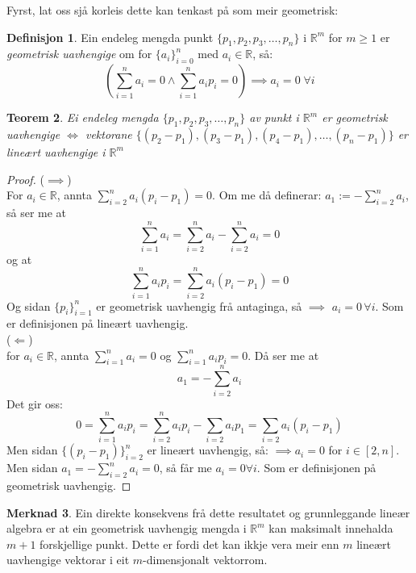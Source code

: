 \documentclass[a4paper, titlepage, 12pt, norsk]{article}
\theoremstyle{plain}
\newtheorem{theorem}{Teorem}[section]
\theoremstyle{definition}
\newtheorem{definition}[theorem]{Definisjon}
\newtheorem{remark}[theorem]{Merknad}
\newcommand{\Rb}{\mathbb{R}}
\begin{document}
Fyrst, lat oss sjå korleis dette kan tenkast på som meir geometrisk:

\begin{definition}
	Ein endeleg mengda punkt $\{p_1, p_2, p_3, \dots, p_n\}$ i $\Rb^m$ for $m\geq1$ er \emph{geometrisk uavhengige} om for $\{a_i\}_{i=0}^n$ med $a_i\in\Rb$, så:
	\begin{equation*}
		\left(\sum_{i=1}^n a_i=0 \land  \sum_{i=1}^n a_ip_i=0\right)\implies a_i=0 \; \forall i
	\end{equation*}
\end{definition}

\begin{theorem}\label{thm:geometrisklineærtuavhengig}
	Ei endeleg mengda $\{p_1, p_2, p_3, \dots, p_n \}$ av punkt i $\Rb^m$ er geometrisk uavhengige $\Longleftrightarrow$ vektorane $\{(p_2-p_1), (p_3-p_1), (p_4-p_1),\dots,(p_n-p_1)\}$ er lineært uavhengige i $\Rb^m$
\end{theorem}

\begin{proof}
	($\implies$)
	\\For $a_i\in\Rb$, annta $\sum_{i=2}^na_i(p_i-p_1)=0$. Om me då definerar: $a_1 := -\sum_{i=2}^na_i$, så ser me at 
	\begin{equation*}
		\sum_{i=1}^na_i=\sum_{i=2}^na_i-\sum_{i=2}^na_i=0
	\end{equation*}
	og at 
	\begin{equation*}
		\sum_{i=1}^na_ip_i=\sum_{i=2}^na_i(p_i-p_1)=0
	\end{equation*}
	Og sidan $\{p_i\}_{i=1}^n$ er geometrisk uavhengig frå antaginga, så $\implies$ $a_i=0 \, \forall i$. Som er definisjonen på lineært uavhengig.
	\\(\(\Longleftarrow\))
	\\for $a_i\in\Rb$, annta $\sum_{i=1}^n a_i=0$ og $\sum_{i=1}^n a_ip_i=0$. Då ser me at 
	\begin{equation*}
		a_1=-\sum_{i=2}^n a_i
	\end{equation*} 
	Det gir oss: 
	\begin{equation*}
		0=\sum_{i=1}^n a_ip_i=\sum_{i=2}^n a_ip_i-\sum_{i=2}a_ip_1=\sum_{i=2}a_i(p_i-p_1)
	\end{equation*}
	Men sidan $\{(p_i-p_1)\}_{i=2}^n$ er lineært uavhengig, så: $\implies a_i = 0$ for $i\in[2,n]$. Men sidan $a_1 = -\sum_{i=2}^n a_i=0$, så får me $a_i=0 \forall i$. Som er definisjonen på geometrisk uavhengig.
\end{proof}

\begin{remark}
	Ein direkte konsekvens frå dette resultatet og grunnleggande lineær algebra er at ein geometrisk uavhengig mengda i $\Rb^m$ kan maksimalt innehalda $m+1$ forskjellige punkt. Dette er fordi det kan ikkje vera meir enn $m$ lineært uavhengige vektorar i eit $m$-dimensjonalt vektorrom.
\end{remark}
\end{document}

